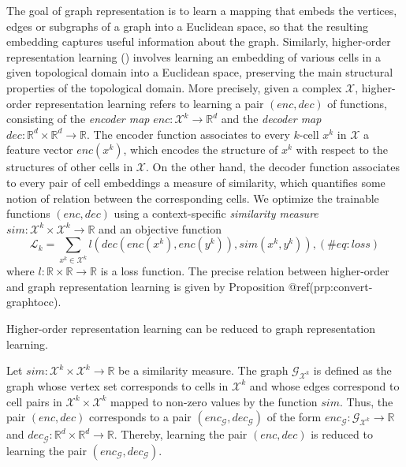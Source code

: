 \documentclass[
  12pt,
]{krantz}
\begin{document}
The goal of graph representation is to learn a mapping that embeds the
vertices, edges or subgraphs of a graph into a Euclidean space, so that
the resulting embedding captures useful information about the graph.
Similarly, higher-order representation learning
() involves
learning an embedding of various cells in a given topological domain
into a Euclidean space, preserving the main structural properties of the
topological domain. More precisely, given a complex \(\mathcal{X}\),
higher-order representation learning refers to learning a pair
\((enc, dec)\) of functions, consisting of the \emph{encoder map}
\(enc \colon \mathcal{X}^k \to \mathbb{R}^d\) and the \emph{decoder map}
\(dec \colon \mathbb{R}^d \times \mathbb{R}^d \to \mathbb{R}\). The
encoder function associates to every \(k\)-cell \(x^k\) in
\(\mathcal{X}\) a feature vector \(enc(x^k)\), which encodes the
structure of \(x^k\) with respect to the structures of other cells in
\(\mathcal{X}\). On the other hand, the decoder function associates to
every pair of cell embeddings a measure of similarity, which quantifies
some notion of relation between the corresponding cells. We optimize the
trainable functions \((enc, dec)\) using a context-specific
\emph{similarity measure}
\(sim \colon \mathcal{X}^k \times \mathcal{X}^k \to \mathbb{R}\) and an
objective function \begin{equation}
\mathcal{L}_k=\sum_{ x^k \in \mathcal{X}^k     } l(  dec(  enc(x^{k}), enc(y^{k})),sim(x^{k},y^k)),
(\#eq:loss)
\end{equation} where
\(l \colon \mathbb{R} \times \mathbb{R} \to \mathbb{R}\) is a loss
function. The precise relation between higher-order and graph
representation learning is given by Proposition
@ref(prp:convert-graphtocc).

\label{convert-graphtocc}
Higher-order representation learning can be reduced to graph
representation learning.

Let \(sim\colon \mathcal{X}^k \times \mathcal{X}^k \to \mathbb{R}\) be a
similarity measure. The graph \(\mathcal{G}_{\mathcal{X}^k}\) is defined
as the graph whose vertex set corresponds to cells in \(\mathcal{X}^k\)
and whose edges correspond to cell pairs in
\(\mathcal{X}^k \times \mathcal{X}^k\) mapped to non-zero values by the
function \(sim\). Thus, the pair \((enc, dec)\) corresponds to a pair
\((enc_{\mathcal{G}}, dec_{\mathcal{G}})\) of the form
\(enc_{\mathcal{G}}\colon \mathcal{G}_{\mathcal{X}^k} \to \mathbb{R}\)
and
\(dec_{\mathcal{G}}\colon \mathbb{R}^d \times \mathbb{R}^d \to \mathbb{R}\).
Thereby, learning the pair \((enc, dec)\) is reduced to learning the
pair \((enc_{\mathcal{G}}, dec_{\mathcal{G}})\).
\end{document}
